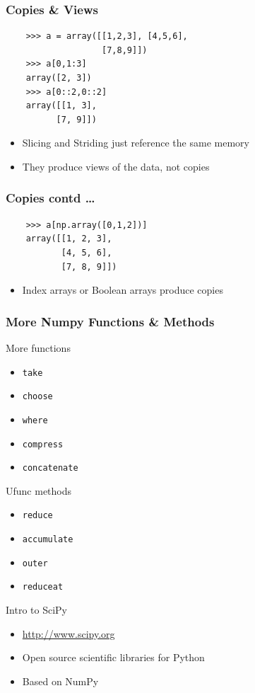 \documentclass[14pt,compress]{beamer}
\newcounter{time}
\newcommand{\inctime}[1]{\addtocounter{time}{#1}{\tiny \thetime\ m}}
\newcommand{\typ}[1]{\lstinline{#1}}
\begin{document}
\begin{frame}[fragile]
  \frametitle{Copies \& Views}
  \begin{lstlisting}
    >>> a = array([[1,2,3], [4,5,6],     
                   [7,8,9]])
    >>> a[0,1:3]
    array([2, 3])
    >>> a[0::2,0::2]
    array([[1, 3],
          [7, 9]])
  \end{lstlisting}
  \begin{itemize}
  \item Slicing and Striding just reference the same memory
  \item They produce views of the data, not copies
  \end{itemize}
\end{frame}

\begin{frame}[fragile]
  \frametitle{Copies contd \ldots}
  \begin{lstlisting}
    >>> a[np.array([0,1,2])]
    array([[1, 2, 3],
           [4, 5, 6],
           [7, 8, 9]])
  \end{lstlisting}
  \begin{itemize}
  \item Index arrays or Boolean arrays produce copies
  \end{itemize}
\end{frame}

\begin{frame}
  \frametitle{More Numpy Functions \& Methods}
  More functions
  \begin{itemize}
    \item \typ{take}
    \item \typ{choose}
    \item \typ{where}
    \item \typ{compress}
    \item \typ{concatenate}
  \end{itemize}
  Ufunc methods 
  \begin{itemize}
    \item \typ{reduce}
    \item \typ{accumulate}
    \item \typ{outer}
    \item \typ{reduceat}
  \end{itemize}
\inctime{5}
\end{frame}

\begin{frame}
    {Intro to SciPy}
  \begin{itemize}
  \item \url{http://www.scipy.org}
  \item Open source scientific libraries for Python
  \item Based on NumPy
    \end{itemize}
\end{frame}
\end{document}
